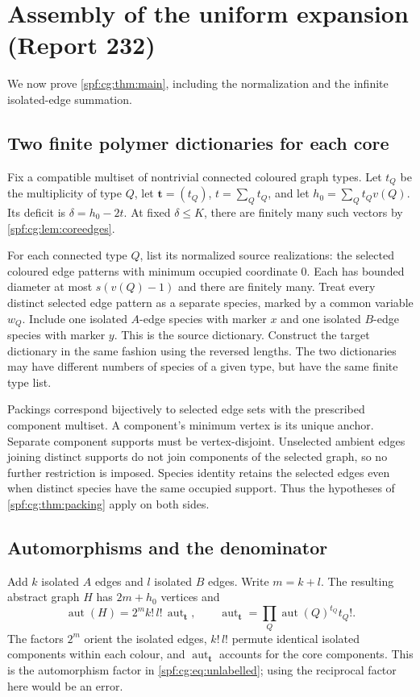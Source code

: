 \documentclass[11pt]{article}
\numberwithin{equation}{section}
\theoremstyle{definition}
\theoremstyle{remark}
\theoremstyle{definition}
\begin{document}
\section{Assembly of the uniform expansion (Report 232)}
\label{spf:cg:sec:assembly}

We now prove \cref{spf:cg:thm:main}, including the normalization and the
infinite isolated-edge summation.

\subsection{Two finite polymer dictionaries for each core}
Fix a compatible multiset of nontrivial connected coloured graph types.
Let $t_Q$ be the multiplicity of type $Q$, let $\boldsymbol t=(t_Q)$,
$t=\sum_Qt_Q$, and let $h_0=\sum_Qt_Qv(Q)$. Its deficit is
$\delta=h_0-2t$. At fixed $\delta\le K$, there are finitely many such
vectors by \cref{spf:cg:lem:coreedges}.

For each connected type $Q$, list its normalized source realizations: the
selected coloured edge patterns with minimum occupied coordinate $0$.
Each has bounded diameter at most $s(v(Q)-1)$ and there are finitely many.
Treat every distinct selected edge pattern as a separate species, marked by
a common variable $w_Q$. Include one isolated $A$-edge species with marker
$x$ and one isolated $B$-edge species with marker $y$. This is the source
dictionary. Construct the target dictionary in the same fashion using the
reversed lengths. The two dictionaries may have different numbers of
species of a given type, but have the same finite type list.

Packings correspond bijectively to selected edge sets with the prescribed
component multiset. A component's minimum vertex is its unique anchor.
Separate component supports must be vertex-disjoint. Unselected ambient
edges joining distinct supports do not join components of the selected
graph, so no further restriction is imposed. Species identity retains the
selected edges even when distinct species have the same occupied support.
Thus the hypotheses of \cref{spf:cg:thm:packing} apply on both sides.

\subsection{Automorphisms and the denominator}
Add $k$ isolated $A$ edges and $l$ isolated $B$ edges. Write $m=k+l$. The
resulting abstract graph $H$ has $2m+h_0$ vertices and
\begin{equation}
 \operatorname{aut}(H)=2^mk!\,l!\,\operatorname{aut}_{\boldsymbol t},\qquad
 \operatorname{aut}_{\boldsymbol t}=\prod_Q\operatorname{aut}(Q)^{t_Q}t_Q!.
 \label{spf:cg:eq:autfactor}
\end{equation}
The factors $2^m$ orient the isolated edges, $k!\,l!$ permute identical
isolated components within each colour, and $\operatorname{aut}_{\boldsymbol t}$
accounts for the core components. This is the automorphism factor in
\eqref{spf:cg:eq:unlabelled}; using the reciprocal factor here would be an
error.
\end{document}
